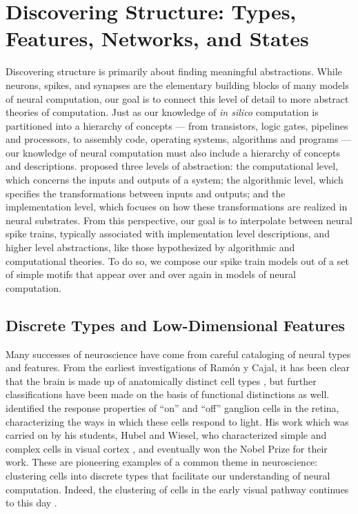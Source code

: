 \section{Discovering Structure: Types, Features, Networks, and States}
Discovering structure is primarily about finding meaningful abstractions.  
While neurons, spikes, and
synapses are the elementary building blocks of many models of neural
computation, our goal is to connect this level of detail to more
abstract theories of computation.  Just as our knowledge of
\emph{in silico} computation is partitioned into a hierarchy of
concepts --- from transistors, logic gates, pipelines and processors,
to assembly code, operating systems, algorithms and programs --- our
knowledge of neural computation must also include a hierarchy of
concepts and descriptions.  \citet{marr1982vision} proposed three
levels of abstraction: the computational level, which concerns the inputs
and outputs of a system; the algorithmic level, which specifies the
transformations between inputs and outputs; and the implementation
level, which focuses on how these transformations are realized in
neural substrates.  From this perspective, our goal is to interpolate
between neural spike trains, typically associated with implementation
level descriptions, and higher level abstractions, like those
hypothesized by algorithmic and computational theories. To do so,
we compose our spike train models out of a set of simple
motifs that appear over and over again in models of
neural computation. 

\subsection{Discrete Types and Low-Dimensional Features}
Many successes of neuroscience have come from careful cataloging of
neural types and features.  From the earliest investigations of
Ram\'on y Cajal, it has been clear that the brain is made up of
anatomically distinct cell types \citep{cajal1899textura}, but further
classifications have been made on the basis of functional distinctions
as well. \citet{kuffler1953discharge} identified the response
properties of ``on'' and ``off'' ganglion cells in the retina,
characterizing the ways in which these cells respond to light. His
work which was carried on by his students, Hubel and Wiesel, who
characterized simple and complex cells in visual cortex
\citep{hubel1962receptive}, and eventually won the Nobel Prize for
their work.  These are pioneering examples of a common theme in
neuroscience: clustering cells into discrete types that facilitate our
understanding of neural computation. Indeed, the clustering of cells
in the early visual pathway continues to this day
\citep{macosko2015highly, sanes2015types}.

